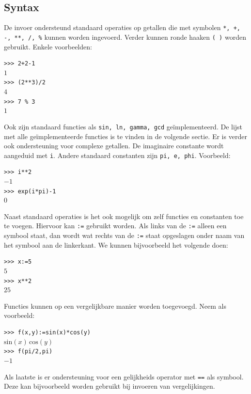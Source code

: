 \documentclass[a4paper]{article}
\begin{document}
\subsection{Syntax}
De invoer ondersteund standaard operaties op getallen die met symbolen \texttt{*, +, -, **, /, \%} kunnen worden ingevoerd. Verder kunnen ronde haaken \texttt{( )} worden gebruikt. Enkele voorbeelden:
\begin{adjustwidth}{1.5cm}{}
\texttt{>>> 2+2-1}\\
$1$\\
\texttt{>>> (2**3)/2}\\
$4$\\
\texttt{>>> 7 \% 3}\\
$1$
\end{adjustwidth}
Ook zijn standaard functies als \texttt{sin, ln, gamma, gcd} ge\"implementeerd. %
De lijst met alle ge\"implementeerde functies is te vinden in de volgende sectie. Er is verder ook ondersteuning voor complexe getallen. De imaginaire constante wordt aangeduid met \texttt{i}. Andere standaard constanten zijn \texttt{pi, e, phi}. Voorbeeld:
\begin{adjustwidth}{1.5cm}{}
\texttt{>>> i**2}\\
$-1$\\
\texttt{>>> exp(i*pi)-1}\\
$0$
\end{adjustwidth}
Naast standaard operaties is het ook mogelijk om zelf functies en constanten toe te voegen. Hiervoor kan \texttt{:=} gebruikt worden. Als links van de \texttt{:=} alleen een symbool staat, dan wordt wat rechts van de \texttt{:=} staat opgeslagen onder naam van het symbool aan de linkerkant. We kunnen bijvoorbeeld het volgende doen:
\begin{adjustwidth}{1.5cm}{}
\texttt{>>> x:=5}\\
$5$\\
\texttt{>>> x**2}\\
$25$
\end{adjustwidth}
Functies kunnen op een vergelijkbare manier worden toegevoegd. Neem als voorbeeld:
\begin{adjustwidth}{1.5cm}{}
\texttt{>>> f(x,y):=sin(x)*cos(y)}\\
$\mathrm{sin}(x)\,\mathrm{cos}(y)$\\
\texttt{>>> f(pi/2,pi)}\\
$-1$
\end{adjustwidth}
Als laatste is er ondersteuning voor een gelijkheids operator met \texttt{==} als symbool. Deze kan bijvoorbeeld worden gebruikt bij invoeren van vergelijkingen.
\end{document}
